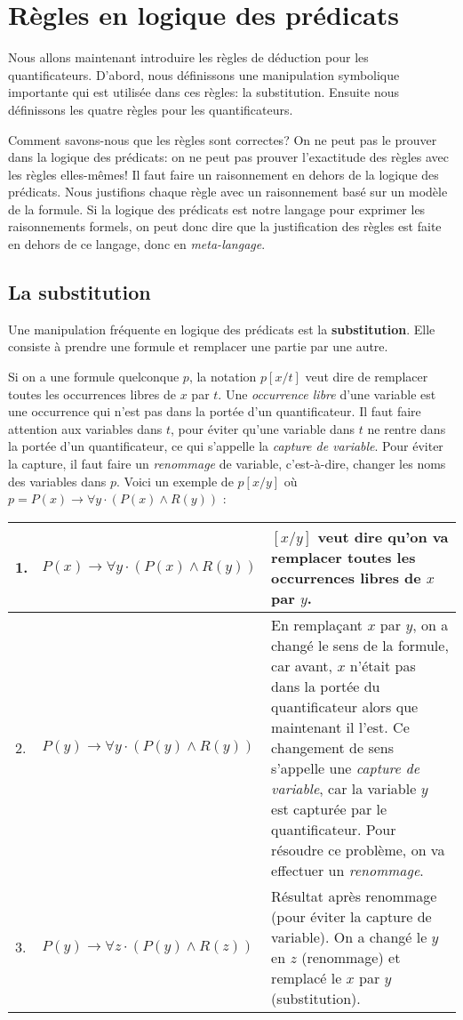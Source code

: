 \section{Règles en logique des prédicats}

Nous allons maintenant introduire les règles de déduction pour les quantificateurs.
D'abord, nous définissons une manipulation symbolique importante qui est utilisée
dans ces règles: la substitution.
Ensuite nous définissons les quatre règles pour les quantificateurs.

Comment savons-nous que les règles sont correctes?
On ne peut pas le prouver dans la logique des prédicats: on ne peut pas prouver l'exactitude
des règles avec les règles elles-mêmes!
Il faut faire un raisonnement en dehors de la logique des prédicats.
Nous justifions chaque règle avec un raisonnement basé sur un modèle de la formule.
Si la logique des prédicats est notre langage pour exprimer les raisonnements formels,
on peut donc dire que la justification des règles est faite en dehors de ce langage, donc en {\em meta-langage}.

\subsection{La substitution}
Une manipulation fréquente en logique des prédicats est la \textbf{substitution}. Elle consiste à prendre une formule et remplacer une partie par une autre.

Si on a une formule quelconque $p$, la notation $p[x/t]$ veut dire de remplacer toutes les occurrences libres de $x$ par $t$.
Une {\em occurrence libre} d'une variable est une occurrence qui n'est pas dans la portée d'un quantificateur.
Il faut faire attention aux variables dans $t$, pour éviter qu'une variable dans $t$ ne rentre dans la portée d'un quantificateur,
ce qui s'appelle la {\em capture de variable}.
Pour éviter la capture, il faut faire un {\em renommage} de variable, c'est-à-dire, changer les noms des variables dans $p$.
Voici un exemple de $p[x/y]$ où $p = P(x) \rightarrow \forall y \cdot (P(x) \wedge R(y))$ :
\begin{center}
\begin{tabular}{|l |l |>{\raggedright}m{6cm}|}
\hline
1. &$P(x) \rightarrow \forall y \cdot (P(x) \wedge R(y))$&$[x/y]$ veut dire qu'on va remplacer toutes les occurrences libres de $x$ par $y$.\tabularnewline
\hline
2. &$P(y) \rightarrow \forall y \cdot (P(y) \wedge R(y))$&En remplaçant $x$ par $y$, on a changé le sens de la formule, car avant, $x$ n'était pas dans la portée du quantificateur alors que maintenant il l'est. Ce changement de sens s'appelle une \textit{capture de variable}, car la variable $y$ est capturée par le quantificateur. Pour résoudre ce problème, on va effectuer un \textit{renommage}.\tabularnewline
\hline
3. &$P(y) \rightarrow \forall z \cdot (P(y) \wedge R(z))$&Résultat après renommage (pour éviter la capture de variable).
On a changé le $y$ en $z$ (renommage) et remplacé le $x$ par $y$ (substitution). \tabularnewline
\hline
\end{tabular}
\end{center}

